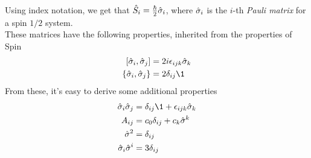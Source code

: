\documentclass[../qm.tex]{subfiles}
\begin{document}
	Using index notation, we get that $\hat{S}_i=\frac{\hbar}{2}\hat{\sigma}_i$, where $\hat{\sigma}_i$ is the $i$-th \textit{Pauli matrix} for a spin $1/2$ system.\\
	These matrices have the following properties, inherited from the properties of Spin
	\begin{equation}
		\begin{aligned}
			\comm{\opr{\sigma}_i}{\opr{\sigma}_j}&=2i\lc{ijk}\opr{\sigma}_k\\
			\acomm{\opr{\sigma}_i}{\opr{\sigma}_j}&=2\kd{ij}\1
		\end{aligned}
		\label{eq:pauliprop}
	\end{equation}
	From these, it's easy to derive some additional properties
	\begin{equation*}
		\begin{aligned}
			\opr{\sigma}_i\opr{\sigma}_j&=\kd{ij}\1+\lc{ijk}\opr{\sigma}_k\\
			A_{ij}&=c_0\kd{ij}+c_k\opr{\sigma}^k\\
			\opr{\sigma}^2&=\kd{ij}\\
			\opr{\sigma}_i\opr{\sigma}^i&=3\kd{ij}
		\end{aligned}
	\end{equation*}
\end{document}
